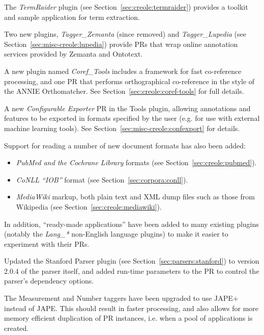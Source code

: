 

The \emph{TermRaider} plugin (see Section~\ref{sec:creole:termraider})
provides a toolkit and sample application for term extraction.

Two new plugins, \emph{Tagger\_Zemanta} (since removed)
and \emph{Tagger\_Lupedia} (see
Section~\ref{sec:misc-creole:lupedia}) provide PRs that wrap online annotation
services provided by Zemanta and Ontotext.

A new plugin named \emph{Coref\_Tools} includes a framework for fast
co-reference processing, and one PR that performs orthographical co-reference in
the style of the ANNIE Orthomatcher. See Section~\ref{sec:creole:coref-tools}
for full details.

A new \emph{Configurable Exporter} PR in the Tools plugin, allowing annotations
and features to be exported in formats specified by the user (e.g. for use with
external machine learning tools).  See Section~\ref{sec:misc-creole:confexport}
for details.

Support for reading a number of new document formats has also been added:
\begin{itemize}
\item \emph{PubMed and the Cochrane Library} formats (see
  Section~\ref{sec:creole:pubmed}).
\item \emph{CoNLL ``IOB''} format (see Section~\ref{sec:corpora:conll}).
\item\emph{MediaWiki} markup, both plain text and XML dump files such as those
  from Wikipedia (see Section~\ref{sec:creole:mediawiki}).
\end{itemize}

In addition, ``ready-made applications'' have been added to many existing
plugins (notably the \emph{Lang\_*} non-English language plugins) to make it
easier to experiment with their PRs.


Updated the Stanford Parser plugin (see Section~\ref{sec:parsers:stanford}) to
version 2.0.4 of the parser itself, and added run-time parameters to the PR to
control the parser's dependency options.

The Measurement and Number taggers have been upgraded to use JAPE+ instead of
JAPE.  This should result in faster processing, and also allows for more memory
efficient duplication of PR instances, i.e. when a pool of applications is
created.

